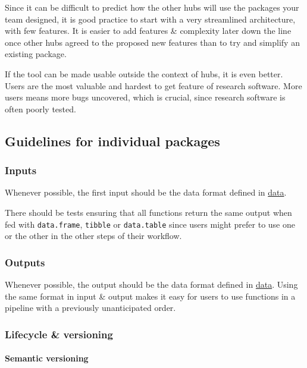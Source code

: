\documentclass[
  letterpaper,
  DIV=11,
  numbers=noendperiod]{scrartcl}
\begin{document}
Since it can be difficult to predict how the other hubs will use the
packages your team designed, it is good practice to start with a very
streamlined architecture, with few features. It is easier to add
features \& complexity later down the line once other hubs agreed to the
proposed new features than to try and simplify an existing package.

If the tool can be made usable outside the context of hubs, it is even
better. Users are the most valuable and hardest to get feature of
research software. More users means more bugs uncovered, which is
crucial, since research software is often poorly tested.

\hypertarget{guidelines-for-individual-packages}{%
\subsection{Guidelines for individual
packages}\label{guidelines-for-individual-packages}}

\hypertarget{inputs}{%
\subsubsection{Inputs}\label{inputs}}

Whenever possible, the first input should be the data format defined in
\protect\hyperlink{data}{data}.

There should be tests ensuring that all functions return the same output
when fed with \texttt{data.frame}, \texttt{tibble} or
\texttt{data.table} since users might prefer to use one or the other in
the other steps of their workflow.

\hypertarget{outputs}{%
\subsubsection{Outputs}\label{outputs}}

Whenever possible, the output should be the data format defined in
\protect\hyperlink{data}{data}. Using the same format in input \& output
makes it easy for users to use functions in a pipeline with a previously
unanticipated order.

\hypertarget{lifecycle-versioning}{%
\subsubsection{Lifecycle \& versioning}\label{lifecycle-versioning}}

\hypertarget{semantic-versioning}{%
\paragraph{Semantic versioning}\label{semantic-versioning}}
\end{document}
